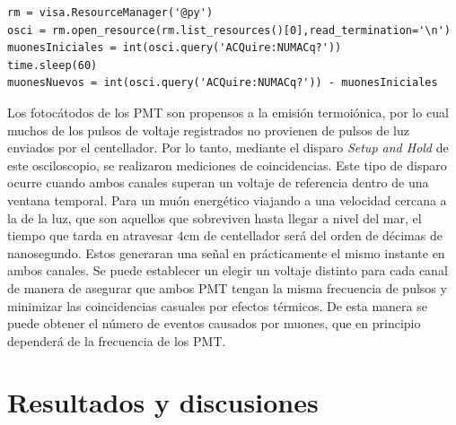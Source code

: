\documentclass[12pt,a4paper]{article}
\numberwithin{equation}{section}
\begin{document}
\small
\begin{verbatim}
rm = visa.ResourceManager('@py')
osci = rm.open_resource(rm.list_resources()[0],read_termination='\n')
muonesIniciales = int(osci.query('ACQuire:NUMACq?'))
time.sleep(60)
muonesNuevos = int(osci.query('ACQuire:NUMACq?')) - muonesIniciales
\end{verbatim}

\normalsize
Los fotocátodos de los PMT son propensos a la emisión termoiónica, por lo cual muchos de los pulsos de voltaje registrados no provienen de pulsos de luz enviados por el centellador. Por lo tanto, mediante el disparo \textit{Setup and Hold} de este osciloscopio, se realizaron mediciones de coincidencias. Este tipo de disparo ocurre cuando ambos canales superan un voltaje de referencia dentro de una ventana temporal. Para un muón energético viajando a una velocidad cercana a la de la luz, que son aquellos que sobreviven hasta llegar a nivel del mar, el tiempo que tarda en atravesar $4$cm de centellador será del orden de décimas de nanosegundo. Estos generaran una señal en prácticamente el mismo instante en ambos canales. Se puede establecer un elegir un voltaje distinto para cada canal de manera de asegurar que ambos PMT tengan la misma frecuencia de pulsos y minimizar las coincidencias casuales por efectos térmicos. De esta manera se puede obtener el número de eventos causados por muones, que en principio dependerá de la frecuencia de los PMT. 

\section{Resultados y discusiones}

\end{document}
